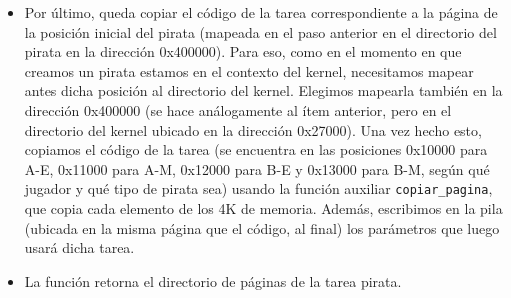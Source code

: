 \begin{itemize}
\item Por último, queda copiar el código de la tarea correspondiente a la página de la posición inicial del pirata (mapeada en el paso anterior en el directorio del pirata en la dirección 0x400000). Para eso, como en el momento en que creamos un pirata estamos en el contexto del kernel, necesitamos mapear antes dicha posición al directorio del kernel. Elegimos mapearla también en la dirección 0x400000 (se hace análogamente al ítem anterior, pero en el directorio del kernel ubicado en la dirección 0x27000). Una vez hecho esto, copiamos el código de la tarea (se encuentra en las posiciones 0x10000 para A-E, 0x11000 para A-M, 0x12000 para B-E y 0x13000 para B-M, según qué jugador y qué tipo de pirata sea) usando la función auxiliar \texttt{copiar_pagina}, que copia cada elemento de los 4K de memoria. Además, escribimos en la pila (ubicada en la misma página que el código, al final) los parámetros que luego usará dicha tarea.

\item La función retorna el directorio de páginas de la tarea pirata.

\end{itemize}

\par 














